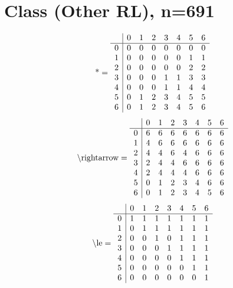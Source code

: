 \documentclass[11pt]{article}
\begin{document}
\section{Class (Other RL), n=691}
\[\text{*} = 
\begin{array}{r | r r r r r r r}
 & 0 & 1 & 2 & 3 & 4 & 5 & 6 \\ \hline
0 & 0 & 0 & 0 & 0 & 0 & 0 & 0 \\
1 & 0 & 0 & 0 & 0 & 0 & 1 & 1 \\
2 & 0 & 0 & 0 & 0 & 0 & 2 & 2 \\
3 & 0 & 0 & 0 & 1 & 1 & 3 & 3 \\
4 & 0 & 0 & 0 & 1 & 1 & 4 & 4 \\
5 & 0 & 1 & 2 & 3 & 4 & 5 & 5 \\
6 & 0 & 1 & 2 & 3 & 4 & 5 & 6 \\
\end{array}
\]
\[\text{\textbackslash rightarrow} = 
\begin{array}{r | r r r r r r r}
 & 0 & 1 & 2 & 3 & 4 & 5 & 6 \\ \hline
0 & 6 & 6 & 6 & 6 & 6 & 6 & 6 \\
1 & 4 & 6 & 6 & 6 & 6 & 6 & 6 \\
2 & 4 & 4 & 6 & 4 & 6 & 6 & 6 \\
3 & 2 & 4 & 4 & 6 & 6 & 6 & 6 \\
4 & 2 & 4 & 4 & 4 & 6 & 6 & 6 \\
5 & 0 & 1 & 2 & 3 & 4 & 6 & 6 \\
6 & 0 & 1 & 2 & 3 & 4 & 5 & 6 \\
\end{array}
\]
\[\text{\textbackslash le} = 
\begin{array}{r | r r r r r r r}
 & 0 & 1 & 2 & 3 & 4 & 5 & 6 \\ \hline
0 & 1 & 1 & 1 & 1 & 1 & 1 & 1 \\
1 & 0 & 1 & 1 & 1 & 1 & 1 & 1 \\
2 & 0 & 0 & 1 & 0 & 1 & 1 & 1 \\
3 & 0 & 0 & 0 & 1 & 1 & 1 & 1 \\
4 & 0 & 0 & 0 & 0 & 1 & 1 & 1 \\
5 & 0 & 0 & 0 & 0 & 0 & 1 & 1 \\
6 & 0 & 0 & 0 & 0 & 0 & 0 & 1 \\
\end{array}
\]
\end{document}
